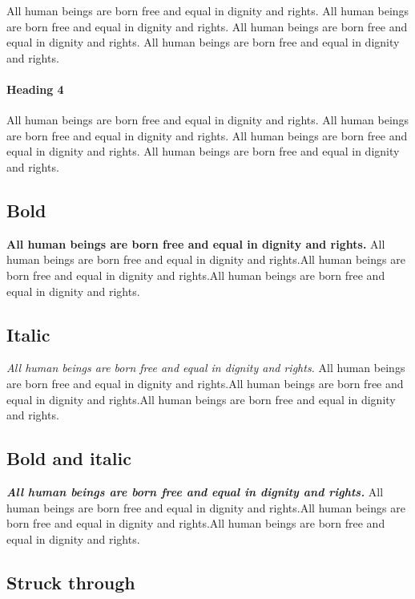 \documentclass[
  ngerman,
  american,
  ]{scrartcl}
\begin{document}
All human beings are born free and equal in dignity and rights. All
human beings are born free and equal in dignity and rights. All human
beings are born free and equal in dignity and rights. All human beings
are born free and equal in dignity and rights.

\paragraph{Heading 4}\label{heading-4}

All human beings are born free and equal in dignity and rights. All
human beings are born free and equal in dignity and rights. All human
beings are born free and equal in dignity and rights. All human beings
are born free and equal in dignity and rights.

\subsection{Bold}\label{bold}

\textbf{All human beings are born free and equal in dignity and rights.}
All human beings are born free and equal in dignity and rights.All human
beings are born free and equal in dignity and rights.All human beings
are born free and equal in dignity and rights.

\subsection{Italic}\label{italic}

\emph{All human beings are born free and equal in dignity and rights.}
All human beings are born free and equal in dignity and rights.All human
beings are born free and equal in dignity and rights.All human beings
are born free and equal in dignity and rights.

\subsection{Bold and italic}\label{bold-and-italic}

\textbf{\emph{All human beings are born free and equal in dignity and
rights.}} All human beings are born free and equal in dignity and
rights.All human beings are born free and equal in dignity and
rights.All human beings are born free and equal in dignity and rights.

\subsection{Struck through}\label{struck-through}
\end{document}
